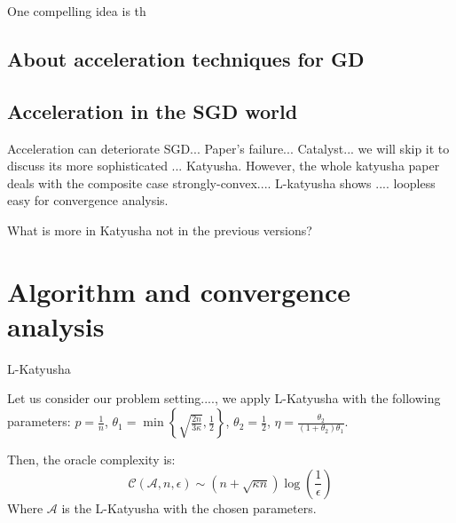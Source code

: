 \documentclass[12pt]{report}
\newcounter{theo}[section]
\newenvironment{theo}[2][]{%
    \refstepcounter{theo}
\newcommand*{\defeq}{\mathrel{\vcenter{\baselineskip0.5ex \lineskiplimit0pt
                     \hbox{\scriptsize.}\hbox{\scriptsize.}}}%
                     =} 
 
\begin{mdframed}[]\relax}{%
\end{mdframed}}
\begin{document}
One compelling idea is th
\subsection{About acceleration techniques for GD}

\subsection{Acceleration in the SGD world}
Acceleration can deteriorate SGD... Paper's failure...
Catalyst... we will skip it to discuss its more sophisticated ... Katyusha. However, the whole katyusha paper deals with the composite case strongly-convex....
L-katyusha shows   ....
loopless 
easy for convergence analysis.

What is more in Katyusha not in the previous versions?
\section{Algorithm and convergence analysis}
\begin{algorithm}
    \Input{ $\theta_1,\theta_2\geq0$, probability $p\in(0,1]$, 
    initialize $y_0=w_0=z_0\in\mathbb{R}^d$, stepsize $\eta=\frac{\theta_2}{(1+\theta_2)\theta_1}$}
    \caption{L-Katyusha}
\end{algorithm}

\newpage
\begin{theo}
LLet us consider our problem setting...., we apply L-Katyusha with the following parameters:
$p=\frac{1}{n}$,  $\theta_1=\min\left\{\sqrt{\frac{2n}{3\kappa}},\frac{1}{2}\right\} $, $\theta_2=\frac{1}{2}$, $\eta=\frac{\theta_2}{(1+\theta_2)\theta_1} $.

Then, the oracle complexity is:
$$ \mathcal{C}(\mathcal{A},n,\epsilon)\sim \left(n+\sqrt{\kappa n}\right)\log\left(\frac{1}{\epsilon}\right)$$
Where $\mathcal{A}$ is the L-Katyusha with the chosen parameters.
\end{theo}
\end{document}
